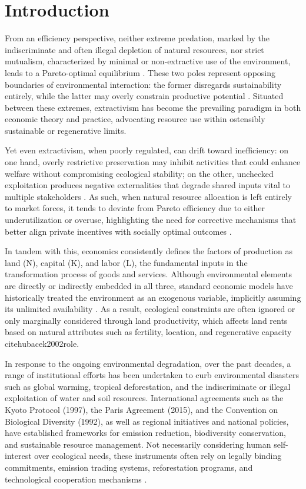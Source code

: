 ﻿
\section{Introduction}

From an efficiency perspective, neither extreme predation, marked by the indiscriminate and often illegal depletion of natural resources, nor strict mutualism, characterized by minimal or non-extractive use of the environment, leads to a Pareto-optimal equilibrium \cite{dasgupta2001human}. These two poles represent opposing boundaries of environmental interaction: the former disregards sustainability entirely, while the latter may overly constrain productive potential \cite{ostrom1990commons}. Situated between these extremes, extractivism has become the prevailing paradigm in both economic theory and practice, advocating resource use within ostensibly sustainable or regenerative limits. 

Yet even extractivism, when poorly regulated, can drift toward inefficiency: on one hand, overly restrictive preservation may inhibit activities that could enhance welfare without compromising ecological stability; on the other, unchecked exploitation produces negative externalities that degrade shared inputs vital to multiple stakeholders \cite{chichilnisky2017north}. As such, when natural resource allocation is left entirely to market forces, it tends to deviate from Pareto efficiency due to either underutilization or overuse, highlighting the need for corrective mechanisms that better align private incentives with socially optimal outcomes \cite{hanley2007environmental}.

In tandem with this, economics consistently defines the factors of production as land (N), capital (K), and labor (L), the fundamental inputs in the transformation process of goods and services. Although environmental elements are directly or indirectly embedded in all three, standard economic models have historically treated the environment as an exogenous variable, implicitly assuming its unlimited availability \cite{jehle2011}. As a result, ecological constraints are often ignored or only marginally considered through land productivity, which affects land rents based on natural attributes such as fertility, location, and regenerative capacity \\cite{hubacek2002role}.

In response to the ongoing environmental degradation, over the past decades, a range of institutional efforts has been undertaken to curb environmental disasters such as global warming, tropical deforestation, and the indiscriminate or illegal exploitation of water and soil resources. International agreements such as the Kyoto Protocol (1997), the Paris Agreement (2015), and the Convention on Biological Diversity (1992), as well as regional initiatives and national policies, have established frameworks for emission reduction, biodiversity conservation, and sustainable resource management. Not necessarily considering human self-interest over ecological needs, these instruments often rely on legally binding commitments, emission trading systems, reforestation programs, and technological cooperation mechanisms \cite{easterly2013tyranny}.

